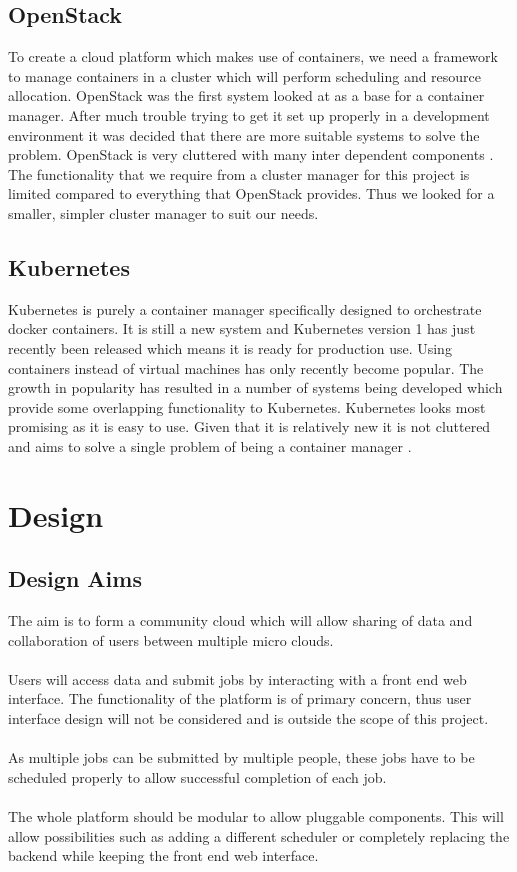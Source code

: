 \documentclass{sig-alternate-05-2015}
\begin{document}
\subsection{OpenStack}
To create a cloud platform which makes use of containers, we need a framework to manage containers in a cluster which will perform scheduling and resource allocation. OpenStack was the first system looked at as a base for a container manager. After much trouble trying to get it set up properly in a development environment it was decided that there are more suitable systems to solve the problem. OpenStack is very cluttered with many inter dependent components \cite{affetti2015adock}. The functionality that we require from a cluster manager for this project is limited compared to everything that OpenStack provides. Thus we looked for a smaller, simpler cluster manager to suit our needs.


\subsection{Kubernetes}
Kubernetes is purely a container manager specifically designed to orchestrate docker containers. It is still a new system and Kubernetes version 1 has just recently been released which means it is ready for production use. Using containers instead of virtual machines has only recently become popular. The growth in popularity has resulted in a number of systems being developed which provide some overlapping functionality to Kubernetes. Kubernetes looks most promising as it is easy to use. Given that it is relatively new it is not cluttered and aims to solve a single problem of being a container manager \cite{kubernetes}. 


\section{Design}


\subsection{Design Aims}
The aim is to form a community cloud which will allow sharing of data and collaboration of users between multiple micro clouds.
\\\\
Users will access data and submit jobs by interacting with a front end web interface. The functionality of the platform is of primary concern, thus user interface design will not be considered and is outside the scope of this project. 
\\\\
As multiple jobs can be submitted by multiple people, these jobs have to be scheduled properly to allow successful completion of each job. 
\\\\
The whole platform should be modular to allow pluggable components. This will allow possibilities such as adding a different scheduler or completely replacing the backend while keeping the front end web interface.
\end{document}
